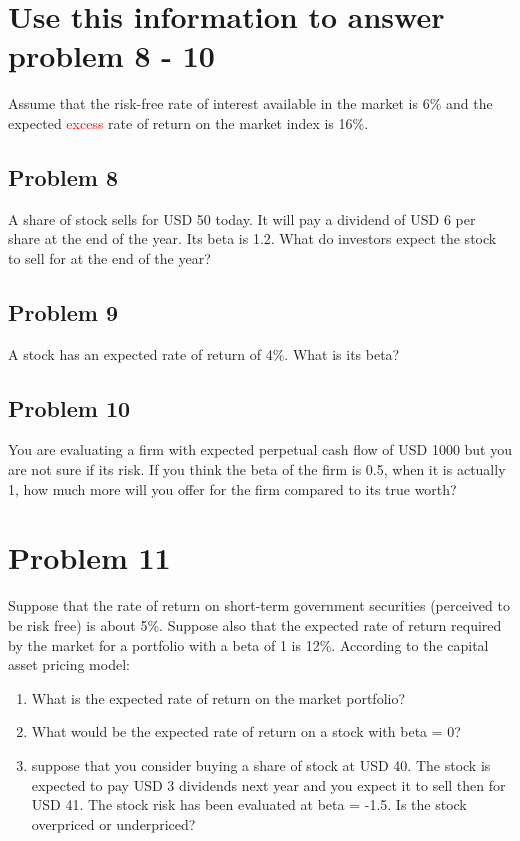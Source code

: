 \documentclass[12]{article}
\begin{document}
\color{black}
\section*{Use this information to answer problem 8 - 10}
{\large Assume that the risk-free rate of interest available in the market is 6\% and the expected \textcolor{red}{excess} rate of return on the market index is 16\%.}
\color{black}
\subsection*{Problem 8}
A share of stock sells for USD 50 today. It will pay a dividend of USD 6 per share at the end of the year. Its beta is 1.2. What do investors expect the stock to sell for at the end of the year? 



\color{black}
\subsection*{Problem 9}
A stock has an expected rate of return of 4\%. What is its beta?



\color{black}
\subsection*{Problem 10}
You are  evaluating a firm with expected perpetual cash flow of USD 1000 but you are not sure if its risk. If you think the beta of the firm is 0.5, when it is actually 1, how much more will you offer for the firm compared to its true worth?




\color{black}
\section*{Problem 11}
Suppose that the rate of return on short-term government securities (perceived to be risk free) is about 5\%. Suppose also that the expected rate of return required by the market for a portfolio with a beta of 1 is 12\%. According to the capital asset pricing model:
\begin{enumerate}
    \item[a)] What is the expected rate of return on the market portfolio?
    \item[b)] What would be the expected rate of return on a stock with beta = 0?
    \item[c)] suppose that you consider buying  a share of stock at USD 40. The stock is expected to pay USD 3 dividends next year and you expect it to sell then for USD 41. The stock risk has been evaluated at beta = -1.5. Is the stock overpriced or underpriced? 
\end{enumerate}
\end{document}
